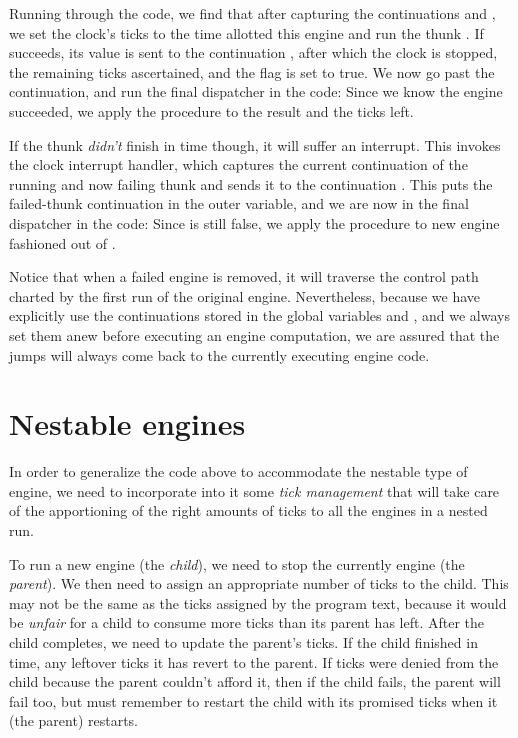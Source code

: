 Running through the code, we find that after capturing
the continuations  and
, we set the clock's ticks to the
time allotted this engine and run the thunk .  If
 succeeds, its value  is sent to the
continuation , after which the
clock is stopped, the remaining ticks ascertained, and
the flag  is set to true.  We now
go past the  continuation, and run
the final dispatcher in the code: Since we know the
engine succeeded, we apply the  procedure to
the result and the ticks left.

If the thunk  {\em didn't} finish in time
though, it will suffer an interrupt.  This invokes the
clock interrupt handler, which captures the current
continuation of the running and now failing thunk and
sends it to the continuation .  This
puts the failed-thunk continuation in the outer
 variable, and we are now in the final
dispatcher in the code: Since  is
still false, we apply the  procedure to new
engine fashioned out of .

Notice that when a failed engine is removed, it will
traverse the control path charted by the first run of
the original engine.  Nevertheless, because we have
explicitly use the continuations stored in the global
variables  and
, and we always set them anew before
executing an engine computation, we are assured that
the jumps will always come back to the currently
executing engine code.

\section{Nestable engines}

In order to generalize the code above to accommodate
the nestable type of engine, we need to incorporate
into it some {\em tick management} that will take
care of the apportioning of the right amounts of ticks
to all the engines in a nested run.

To run a new engine (the {\em child}), we need to
stop the currently engine (the {\em parent}).  We
then need to assign an appropriate number of ticks to
the child.  This may not be the same as the ticks
assigned by the program text, because it would be {\em
unfair} for a child to consume more ticks than its
parent has left.  After the child completes, we need to
update the parent's ticks.  If the child finished in
time, any leftover ticks it has revert to the parent.
If ticks were denied from the child because the parent
couldn't afford it, then if the child fails, the parent
will fail too, but must remember to restart the child
with its promised ticks when it (the parent) restarts.

